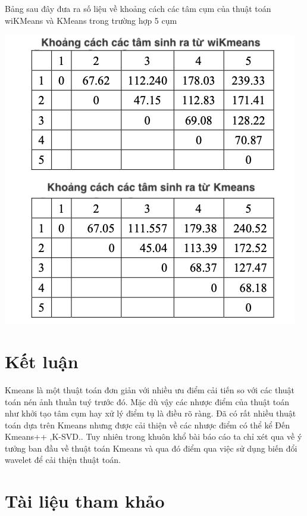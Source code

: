 \documentclass[12pt,a4paper]{article}
\begin{document}
Bảng sau đây đưa ra số liệu về khoảng cách các tâm cụm của thuật toán wiKMeans và KMeans trong trường hợp 5 cụm 

\begin{center}
\includegraphics[scale=0.5]{kmeansimprovedata2.png}
\end{center}

\section{Kết luận}
Kmeans là một thuật toán đơn giản với nhiều ưu điểm cải tiến so với các thuật toán nén ảnh thuần tuý trước đó. Mặc dù vậy các nhược điểm của thuật toán như khởi tạo tâm cụm hay xử lý điểm tụ là điều rõ ràng. Đã có rất nhiều thuật toán dựa trên Kmeans nhưng được cải thiện về các nhược điểm có thể kể Đến Kmeans++ ,K-SVD.. Tuy nhiên trong khuôn khổ bài báo cáo ta chỉ xét qua về ý tưởng ban đầu về thuật toán Kmeans và qua đó điểm qua việc sử dụng biến đổi wavelet để cải thiện thuật toán. 

\section{Tài liệu tham khảo}
\end{document}
